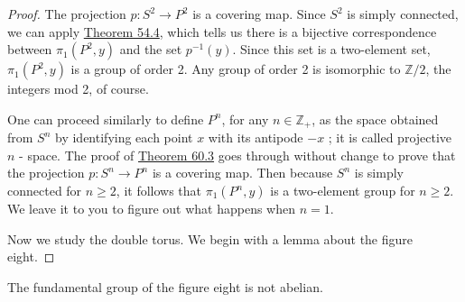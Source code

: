 \begin{proof}
The projection \(p : S^{2} \rightarrow {P}^{2}\) is a covering map. Since \(S^{2}\) is simply connected, we can apply \hyperref[thm:54.4]{Theorem 54.4}, which tells us there is a bijective correspondence between \({\pi }_{1}( {P^{2},y})\) and the set \(p^{-1}( y)\). Since this set is a two-element set, \({\pi }_{1}( {P^{2},y})\) is a group of order 2.
Any group of order 2 is isomorphic to \(\mathbb{Z}/2\), the integers mod 2, of course.

One can proceed similarly to define \(P^{n}\), for any \(n \in {\mathbb{Z}}_{ + }\), as the space obtained from \(S^{n}\) by identifying each point \(x\) with its antipode \(- x\) ; it is called projective \(n\) - space. The proof of \hyperref[thm:60.3]{Theorem 60.3} goes through without change to prove that the projection \(p : S^{n} \rightarrow {P}^{n}\) is a covering map. Then because \(S^{n}\) is simply connected for \(n \geq 2\), it follows that \({\pi }_{1}( {P^{n},y})\) is a two-element group for \(n \geq 2\). We leave it to you to figure out what happens when \(n = 1\).

Now we study the double torus. We begin with a lemma about the figure eight.
\end{proof}
\begin{lemma}
\label{lem:\thetheorem}
The fundamental group of the figure eight is not abelian.
\end{lemma}

